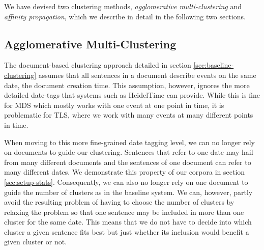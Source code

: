 \documentclass[a4paper,BCOR=10mm]{report}
\numberwithin{lemma}{chapter}
\numberwithin{definition}{chapter}
\begin{document}
We have devised two clustering methods, \textit{agglomerative multi-clustering} and \textit{affinity propagation}, which we describe in detail in the following two sections.

%
%

\subsection{Agglomerative Multi-Clustering}

The document-based clustering approach detailed in section \ref{sec:baseline-clustering} assumes that all sentences in a document describe events on the same date, the document creation time. This assumption, however, ignores the more detailed date-tags that systems such as HeidelTime \citep{heideltime} can provide. While this is fine for MDS which mostly works with one event at one point in time, it is problematic for TLS, where we work with many events at many different points in time.

When moving to this more fine-grained date tagging level, we can no longer rely on documents to guide our clustering. Sentences that refer to one date may hail from many different documents and the sentences of one document can refer to many different dates. We demonstrate this property of our corpora in section \ref{sec:setup-stats}.
Consequently, we can also no longer rely on one document to guide the number of clusters as in the baseline system. We can, however, partly avoid the resulting problem of having to choose the number of clusters by relaxing the problem so that one sentence may be included in more than one cluster for the same date.
This means that we do not have to decide into which cluster a given sentence fits best but just whether its inclusion would benefit a given cluster or not.
\end{document}

